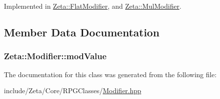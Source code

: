 Implemented in \hyperlink{classZeta_1_1FlatModifier_a2d19ec8d276a43036d3e92462fda7de4}{Zeta\+::\+Flat\+Modifier}, and \hyperlink{classZeta_1_1MulModifier_a499c654aca31ee826db5c88bd4792f52}{Zeta\+::\+Mul\+Modifier}.



\subsection{Member Data Documentation}
\hypertarget{classZeta_1_1Modifier_ae9685e22722b0aaae9edd1a074a6251d}{
\subsubsection[{mod\+Value}]{ Zeta\+::\+Modifier\+::mod\+Value\hspace{0.3cm}{\ttfamily [protected]}}}\label{classZeta_1_1Modifier_ae9685e22722b0aaae9edd1a074a6251d}


The documentation for this class was generated from the following file\+:\begin{DoxyCompactItemize}
\item 
include/\+Zeta/\+Core/\+R\+P\+G\+Classes/\hyperlink{Modifier_8hpp}{Modifier.\+hpp}\end{DoxyCompactItemize}
